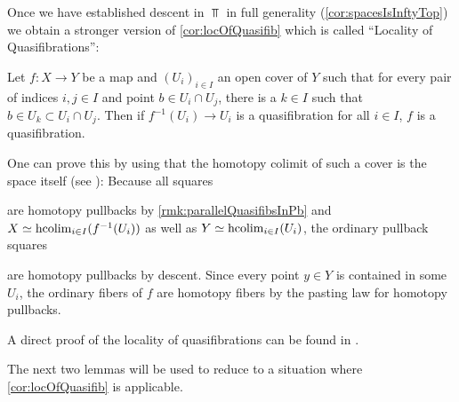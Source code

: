 \begin{remark}\label{rmk:locOfQuasifibDescent}
    Once we have established descent in $\Top$ in full generality (\cref{cor:spacesIsInftyTop}) we obtain a stronger version of \cref{cor:locOfQuasifib} which is called ``Locality of Quasifibrations'':
    
    Let $f\colon X\to Y$ be a map and $(U_i)_{i\in I}$ an open cover of $Y$ such that for every pair of indices $i,j\in I$ and point $b\in U_i\cap U_j$, there is a $k\in I$ such that $b\in U_k\subset U_i\cap U_j$.
    Then if $f^{-1}(U_i)\to U_i$ is a quasifibration for all $i\in I$, $f$ is a quasifibration.

    One can prove this by using that the homotopy colimit of such a cover is the space itself (see \cite[Corollary 1.4]{hypercovers}):
    Because all squares
    \begin{center}
    \end{center}
    are homotopy pullbacks by \cref{rmk:parallelQuasifibsInPb} and $X\simeq\operatorname{hcolim}\limits_{i\in I}(f^{-1}(U_i))$ as well as $Y\simeq\operatorname{hcolim}\limits_{i\in I}(U_i)$, the ordinary pullback squares 
    \begin{center}
    \end{center}
    are homotopy pullbacks by descent.
    Since every point $y\in Y$ is contained in some $U_i$, the ordinary fibers of $f$ are homotopy fibers by the pasting law for homotopy pullbacks. 

    A direct proof of the locality of quasifibrations can be found in \cite[Theorem A.1.2]{aguilar2002algebraic}.
\end{remark}
The next two lemmas will be used to reduce to a situation where \cref{cor:locOfQuasifib} is applicable.
